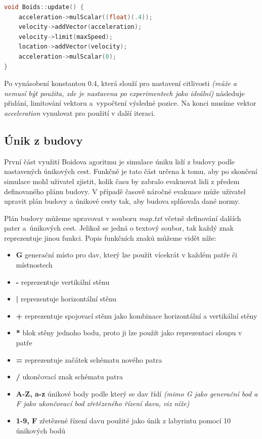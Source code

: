\documentclass[czech,public,dept460,male,cpdeclaration]{diploma}
\begin{document}
\begin{lstlisting}[language=c++,label=src:seek,caption=Nastavení výsledné pozice agenta] 
void Boids::update() {
	acceleration->mulScalar((float)(.4));
	velocity->addVector(acceleration);
	velocity->limit(maxSpeed);
	location->addVector(velocity);
	acceleration->mulScalar(0);
}
\end{lstlisting}

Po vynásobení konstantou 0.4, která slouží pro nastavení citlivosti \textit{(může a nemusí být použita, zde je nastavena po experimentech jako ideální)} následuje přidání, limitování vektoru a~vypočtení výsledné pozice. Na konci musíme vektor \textit{acceleration} vynulovat pro použití v další iteraci.

\subsection{Únik z budovy}\label{sec:unik-z-budovy}
První část využití Boidova agoritmu je simulace úniku lidí z budovy podle nastavených únikových cest. Funkčně je tato část určena k tomu, aby po skončení simulace mohl uživatel zjistit, kolik času by zabralo evakuovat lidi z předem definovaného plánu budovy. V případě časově náročné evakuace může uživatel upravit plán budovy a únikové cesty tak, aby budova splňovala dané normy.

Plán budovy můžeme upravovat v souboru \textit{map.txt} včetně definování dalších pater a~únikových cest. Jelikož se jedná o textový soubor, tak každý znak reprezentuje jinou funkci. Popis funkčních znaků můžeme vidět níže:

\begin{itemize}
	\item \textbf{G} generační místo pro dav, který lze použít vícekrát v každém patře či místnostech
	\item \textbf{-} reprezentuje vertikální stěnu
	\item \textbf{|} reprezentuje horizontální stěnu
	\item \textbf{+} reprezentuje spojovací stěnu jako kombinace horizontální a vertikální stěny
	\item \textbf{*} blok stěny jednoho bodu, proto ji lze použít jako reprezentaci sloupu v patře
	\item \textbf{=} reprezentuje začátek schématu nového patra
	\item \textbf{/} ukončovací znak schématu patra
	\item \textbf{A-Z, a-z} únikové body podle který se dav řídí \textit{(mimo G jako generační bod a F jako ukončovací bod zřetězeného řízení davu, viz níže)}
	\item \textbf{1-9, F} zřetězené řízení davu použité jako únik z labyrintu pomocí 10 únikových bodů
\end{itemize}
\end{document}
